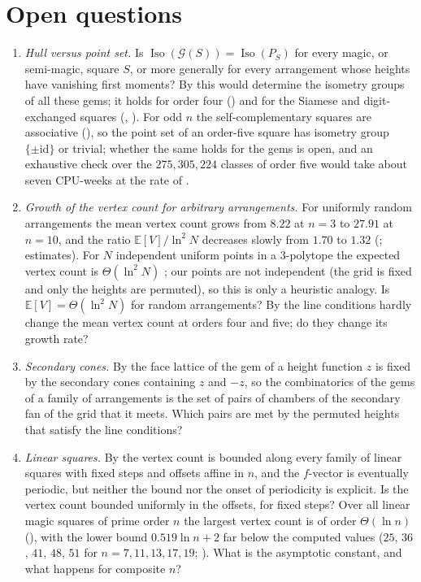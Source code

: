\section{Open questions}
\label{sec:discussion}

\begin{enumerate}\setlength\itemsep{2pt}
\item \emph{Hull versus point set.} Is $\operatorname{Iso}(\mathcal G(S))=\operatorname{Iso}(P_S)$ for every magic, or semi-magic, square $S$, or more generally for every arrangement whose heights have vanishing first moments? By  this would determine the isometry groups of all these gems; it holds for order four () and for the Siamese and digit-exchanged squares (, ). For odd $n$ the self-complementary squares are associative (), so the point set of an order-five square has isometry group $\{\pm\mathrm{id}\}$ or trivial; whether the same holds for the gems is open, and an exhaustive check over the $275{,}305{,}224$ classes of order five would take about seven CPU-weeks at the rate of .
\item \emph{Growth of the vertex count for arbitrary arrangements.} For uniformly random arrangements the mean vertex count grows from $8.22$ at $n=3$ to $27.91$ at $n=10$, and the ratio $\mathbb E[V]/\ln^2N$ decreases slowly from $1.70$ to $1.32$ (; estimates). For $N$ independent uniform points in a $3$-polytope the expected vertex count is $\Theta(\ln^2N)$ \cite{barany1993random}; our points are not independent (the grid is fixed and only the heights are permuted), so this is only a heuristic analogy. Is $\mathbb E[V]=\Theta(\ln^2 N)$ for random arrangements? By  the line conditions hardly change the mean vertex count at orders four and five; do they change its growth rate?
\item \emph{Secondary cones.} By  the face lattice of the gem of a height function $z$ is fixed by the secondary cones containing $z$ and $-z$, so the combinatorics of the gems of a family of arrangements is the set of pairs of chambers of the secondary fan of the grid that it meets. Which pairs are met by the permuted heights that satisfy the line conditions?
\item \emph{Linear squares.} By  the vertex count is bounded along every family of linear squares with fixed steps and offsets affine in $n$, and the $f$-vector is eventually periodic, but neither the bound nor the onset of periodicity is explicit. Is the vertex count bounded uniformly in the offsets, for fixed steps? Over all linear magic squares of prime order $n$ the largest vertex count is of order $\Theta(\ln n)$ (), with the lower bound $0.519\ln n+2$ far below the computed values ($25$, $36$, $41$, $48$, $51$ for $n=7,11,13,17,19$; ). What is the asymptotic constant, and what happens for composite $n$?

\end{enumerate}

